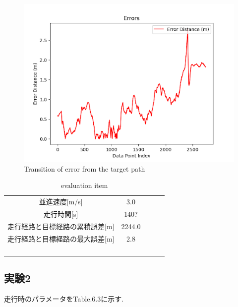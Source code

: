 \begin{figure}[H]
     \centering
    \includegraphics[keepaspectratio, scale=0.7]
         {images/3mserror.png}
    \caption{Transition of error from the target path}
    \label{fig:path}
\end{figure}

\begin{table}[H]
     \centering
     \caption{evaluation item}
     \begin{tabular}{cclll}
     \multicolumn{1}{c|}{並進速度{[}m/s{]}}         & 3.0  &  &  &  \\
     \multicolumn{1}{c|}{走行時間{[}s{]}}           & 140?   &  &  &  \\
     \multicolumn{1}{c|}{走行経路と目標経路の累積誤差{[}m{]}} & 2244.0 &  &  &  \\
     \multicolumn{1}{c|}{走行経路と目標経路の最大誤差{[}m{]}} & 2.8 &  &  &  \\
                                                &      &  &  &  \\
                                                &      &  &  &  \\
     \multicolumn{1}{l}{}                       &      &  &  &  \\
     \multicolumn{1}{l}{}                       &      &  &  & 
     \end{tabular}
\end{table}

\subsection{実験2}
走行時のパラメータをTable.6.3に示す.

